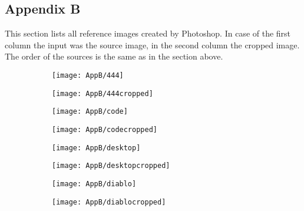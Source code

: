 \documentclass[draft,final]{vutinfth} %
\begin{document}
\begin{appendices}
		\chapter{Appendix B}
		\label{AppB}
		This section lists all reference images created by Photoshop.
		In case of the first column the input was the source image, in the second column the cropped image.
		The order of the sources is the same as in the section above.
		
			\begin{figure}[H]
			\centering
			\begin{subfigure}[b]{0.45\columnwidth}
				\centering
				\texttt{[image: AppB/444]}
			\end{subfigure}
			\begin{subfigure}[b]{0.45\columnwidth}
				\centering
				\texttt{[image: AppB/444cropped]}
			\end{subfigure}
		\end{figure}  
		\begin{figure}[H]
			\centering
			\begin{subfigure}[b]{0.45\columnwidth}
				\centering
				\texttt{[image: AppB/code]}
			\end{subfigure}
			\begin{subfigure}[b]{0.45\columnwidth}
				\centering
				\texttt{[image: AppB/codecropped]}
			\end{subfigure}
		\end{figure}
		\begin{figure}[H]
			\centering
			\begin{subfigure}[b]{0.45\columnwidth}
				\centering
				\texttt{[image: AppB/desktop]}
			\end{subfigure}
			\begin{subfigure}[b]{0.45\columnwidth}
				\centering
				\texttt{[image: AppB/desktopcropped]}
			\end{subfigure}
		\end{figure}
		\begin{figure}[H]
			\centering
			\begin{subfigure}[b]{0.45\columnwidth}
				\centering
				\texttt{[image: AppB/diablo]}
			\end{subfigure}
			\begin{subfigure}[b]{0.45\columnwidth}
				\centering
				\texttt{[image: AppB/diablocropped]}
			\end{subfigure}

\end{figure}
\end{appendices}
\end{document}
